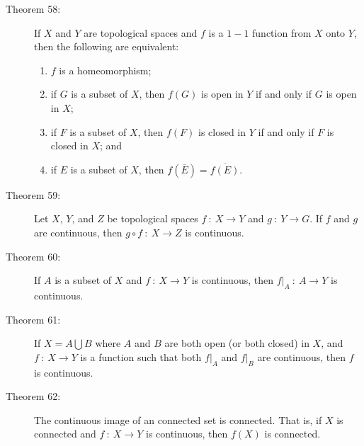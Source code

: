 \documentclass{article}
\begin{document}
\begin{description}
  \item[Theorem 58:] If $X$ and $Y$ are topological spaces and $f$ is a $1-1$ function from $X$ onto $Y$, then the following are equivalent:
    \begin{enumerate}[\hspace{1cm}1.]
      \item $f$ is a homeomorphism;
      \item if $G$ is a subset of $X$, then $f(G)$ is open in $Y$ if and only if $G$ is open in $X$;
      \item if $F$ is a subset of $X$, then $f(F)$ is closed in $Y$ if and only if $F$ is closed in $X$; and
      \item if $E$ is a subset of $X$, then $f(\overline{E}) = \overline{f(E)}$.
    \end{enumerate}

  \item[Theorem 59:] Let $X$, $Y$, and $Z$ be topological spaces $f \ : \ X \rightarrow Y$ and $g \ : \ Y \rightarrow G$. If $f$ and $g$ are continuous, then $g \circ f \ : \ X \rightarrow Z$ is continuous.

  \item[Theorem 60:] If $A$ is a subset of $X$ and $f \ : \ X \rightarrow Y$ is continuous, then $f|_{A} \ : \ A \rightarrow Y$ is continuous.

  \item[Theorem 61:] If $X = A \bigcup B$ where $A$ and $B$ are both open (or both closed) in $X$, and $f \ : \ X \rightarrow Y$ is a function such that both $f|_{A}$ and $f|_{B}$ are continuous, then $f$ is continuous.

  \item[Theorem 62:] The continuous image of an connected set is connected. That is, if $X$ is connected and $f \ : \ X \rightarrow Y$ is continuous, then $f(X)$ is connected.


\end{description}
\end{document}
